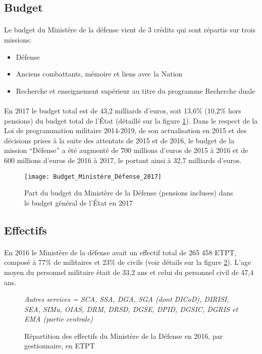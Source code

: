 \documentclass[11pt, book, english, french, standardlists]{upmethodology-document}
\begin{document}
			\subsection{Budget}
				\paragraph*{}
					Le budget du Ministère de la défense vient de 3 crédits qui sont répartis sur trois missions:
					\begin{itemize}
						\item Défense
						\item Anciens combattants, mémoire et liens avec la Nation
						\item Recherche et enseignement supérieur au titre du programme Recherche duale
					\end{itemize}
				\paragraph*{}
					En 2017 le budget total est de 43,2 milliards d'euros, soit 13,6\% (10,2\% hors pensions) du budget total de l'État (détaillé sur la figure \ref{fig:Budget_Ministère_Défense_2017}). Dans le respect de la Loi de programmation militaire 2014-2019, de son actualisation en 2015 et des décisions prises à la suite des attentats de 2015 et de 2016, le budget de la mission ``Défense'' a été augmenté de 700 millions d'euros de 2015 à 2016 et de 600 millions d'euros de 2016 à 2017, le portant ainsi à 32,7 milliards d'euros.
				\begin{figure}[H]
					\centering%
					\texttt{[image: Budget\_Ministère\_Défense\_2017]}
					\caption{Part du budget du Ministère de la Défense (pensions incluses) dans le budget général de l’État en 2017\cite{ChiffresDef2017}}%
					\label{fig:Budget_Ministère_Défense_2017}%
				\end{figure}
			\subsection{Effectifs}
				\paragraph*{}
					En 2016 le Ministère de la défense avait un effectif total de 265 458 \gls{ETPT}, composé à 77\% de militaires et 23\% de civils (voir détails sur la figure \ref{fig:Effectifs_Ministère_Défense_2016}). L'age moyen du personnel militaire était de 33,2 ans et celui du personnel civil de 47,4 ans.
				\begin{figure}[H]
					\centering%
					\caption*{\small\itshape Autres services = \acrshort{SCA}, \acrshort{SSA}, \acrshort{DGA}, \acrshort{SGA} (dont \acrshort{DICoD}), \acrshort{DIRISI}, \acrshort{SEA}, \acrshort{SIMu}, \acrshort{OIAS}, \acrshort{DRM}, \acrshort{DRSD}, \acrshort{DGSE}, \acrshort{DPID}, \acrshort{DGSIC}, \acrshort{DGRIS} et \acrshort{EMA} (partie centrale)}%
					\caption{Répartition des effectifs du Ministère de la Défense en 2016, par gestionnaire, en \acrshort{ETPT}\cite{ChiffresDef2017}}%
					\label{fig:Effectifs_Ministère_Défense_2016}%
				\end{figure}
\end{document}
